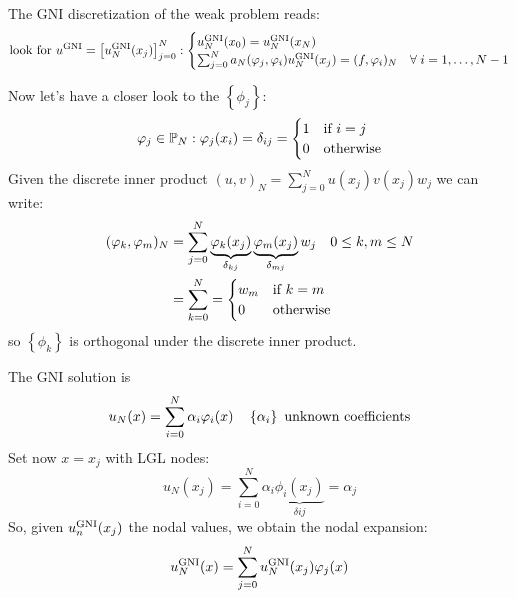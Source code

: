 The GNI discretization of the weak problem reads:
\[
    \text{look for } u^{\text{GNI}} = \left[u_N^{\text{GNI}}(x_j)\right]_{j=0}^N : \begin{cases}
        u_N^{\text{GNI}}(x_0) = u_N^{\text{GNI}}(x_N) \\
        \sum_{j=0}^{N} a_N(\varphi_j, \varphi_i)u_N^{\text{GNI}} (x_j) = (f, \varphi_i)_N & \forall \; i = 1, \ldots, N-1
    \end{cases} 
\]

Now let's have a closer look to the \(\left\{\phi_j\right\}\):
\[
    \varphi_j \in \mathbb{P}_N : \varphi_j(x_i) = \delta_{ij} = \begin{cases}
        1 & \text{if } i = j \\
        0 & \text{otherwise}
    \end{cases}   
\]
Given the discrete inner product \((u,v)_N = \sum_{j=0}^N u(x_j)v(x_j)w_j\) we can write:
\begin{align*}
    (\varphi_k, \varphi_m)_N &= \sum_{j=0}^{N} \underbrace{\varphi_k(x_j)}_{\delta_{kj}} \underbrace{\varphi_m(x_j)}_{\delta_{mj}} w_j \quad 0 \leq k,m \leq N \\
    &= \sum_{k=0}^{N} = \begin{cases}
        w_m & \text{if } k = m \\
        0 & \text{otherwise}
    \end{cases}
\end{align*}
so \(\left\{\phi_k\right\}\) is orthogonal under the discrete inner product.

The GNI solution is 
\[
    u_N(x) = \sum_{i=0}^{N} \alpha_i\varphi_i(x) \quad \left\{\alpha_i\right\} \text{ unknown coefficients}
\]
Set now \(x = x_j\) with LGL nodes:
\[
    u_N(x_j) = \sum_{i=0}^{N} \alpha_i \underbrace{\phi_i(x_j)}_{\delta{ij}} = \alpha_j
\]
So, given \(u_n^{\text{GNI}}(x_j)\) the nodal values, we obtain the nodal expansion:
\[
    u_N^{\text{GNI}}(x) = \sum_{j=0}^{N} u_N^{\text{GNI}} (x_j)\varphi_j(x)
\]
